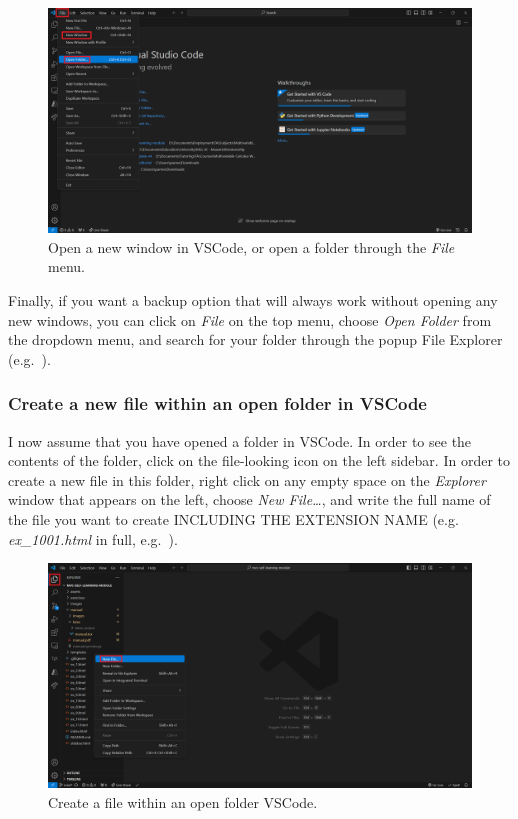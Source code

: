 \documentclass[a4paper,10pt]{article}
\begin{document}
\begin{figure}[htbp]
    \centering
    \includegraphics[width=\textwidth]{vscode_open_folder_2.png}
    \caption{Open a new window in VSCode, or open a folder through the \emph{File} menu.}
    \label{fig:vscode_open_folder_2}   
\end{figure}

Finally, if you want a backup option that will always work without opening any new windows, you can click on \emph{File} on the top menu, choose \emph{Open Folder} from the dropdown menu, and search for your folder through the popup File Explorer (e.g.\ ).

\subsubsection{Create a new file within an open folder in VSCode}

I now assume that you have opened a folder in VSCode. In order to see the contents of the folder, click on the file-looking icon on the left sidebar. In order to create a new file in this folder, right click on any empty space on the \emph{Explorer} window that appears on the left, choose \emph{New File\dots}, and write the full name of the file you want to create INCLUDING THE EXTENSION NAME (e.g. \emph{ex\_1001.html} in full, e.g.\ ). 

\begin{figure}[htbp]
    \centering
    \includegraphics[width=\textwidth]{vscode_create_file.png}
    \caption{Create a file within an open folder VSCode.}
    \label{fig:vscode_create_file}   
\end{figure}
\end{document}
